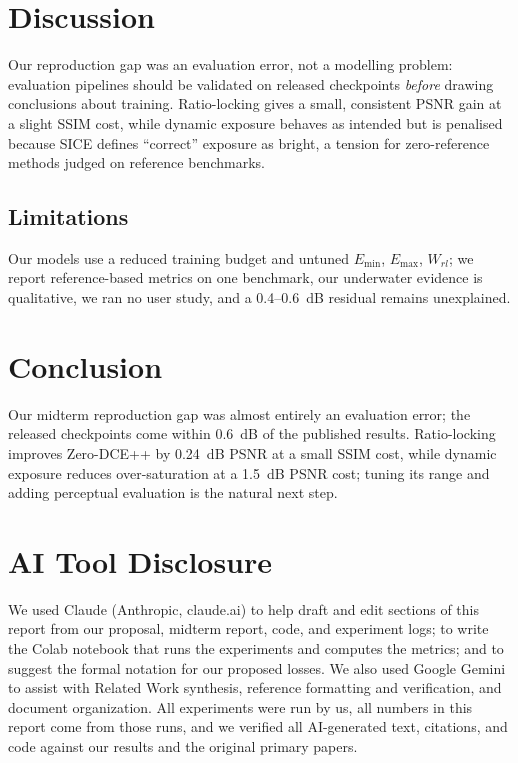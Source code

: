 \documentclass[11pt, letterpaper]{article}
\begin{document}
\section{Discussion}

Our reproduction gap was an evaluation error, not a modelling problem: evaluation
pipelines should be validated on released checkpoints \emph{before} drawing
conclusions about training. Ratio-locking gives a small, consistent PSNR gain at a
slight SSIM cost, while dynamic exposure behaves as intended but is penalised
because SICE defines ``correct'' exposure as bright, a tension for zero-reference
methods judged on reference benchmarks.

\subsection{Limitations}

Our models use a reduced training budget and untuned $E_{\min}$, $E_{\max}$, $W_{rl}$;
we report reference-based metrics on one benchmark, our underwater evidence is
qualitative, we ran no user study, and a 0.4--0.6~dB residual remains unexplained.

\section{Conclusion}

Our midterm reproduction gap was almost entirely an evaluation error; the released
checkpoints come within 0.6~dB of the published results. Ratio-locking improves
Zero-DCE++ by 0.24~dB PSNR at a small SSIM cost, while dynamic exposure reduces
over-saturation at a 1.5~dB PSNR cost; tuning its range and adding perceptual
evaluation is the natural next step.

\section{AI Tool Disclosure}

We used Claude (Anthropic, claude.ai) to help draft and edit sections of this report
from our proposal, midterm report, code, and experiment logs; to write the Colab
notebook that runs the experiments and computes the metrics; and to suggest the
formal notation for our proposed losses. We also used Google Gemini to assist with
Related Work synthesis, reference formatting and verification, and document
organization. All experiments were run by us, all numbers in this report come from
those runs, and we verified all AI-generated text, citations, and code against our
results and the original primary papers.
\end{document}
